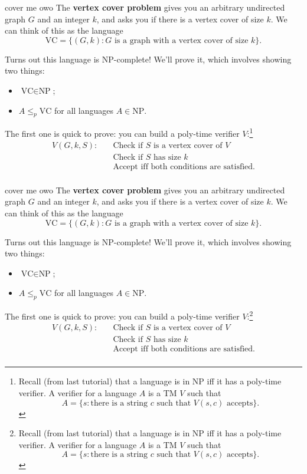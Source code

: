 \documentclass{beamer}
\begin{document}
\begin{frame}{cover me owo \emojiflushed}
The \textbf{vertex cover problem} gives you an arbitrary undirected graph $G$ and an integer $k$, and asks you if there is a vertex cover of size $k$. We can think of this as the language
$$\text{VC} = \{(G, k): \text{$G$ is a graph with a vertex cover of size $k$}\}.$$

Turns out this language is NP-complete! We'll prove it, which involves showing two things:
\begin{itemize}
\item $\text{VC}\in \text{NP}$;
\item $A \leq_p \text{VC}$ for all languages $A \in \text{NP}$.
\end{itemize}

The first one is quick to prove: you can build a poly-time verifier $V$:\footnote{
Recall (from last tutorial) that a language is in NP iff it has a poly-time verifier. A verifier for a language $A$ is a TM $V$ such that
$$A = \{s: \text{there is a string $c$ such that $V(s, c)$ accepts}\}.$$}
\begin{align*}
V(G, k, S): \quad &\text{Check if $S$ is a vertex cover of $V$}\\
&\text{Check if $S$ has size $k$}\\
&\text{Accept iff both conditions are satisfied.}\\
\end{align*}
\end{frame}

\begin{frame}{cover me owo \emojiflushed}
The \textbf{vertex cover problem} gives you an arbitrary undirected graph $G$ and an integer $k$, and asks you if there is a vertex cover of size $k$. We can think of this as the language
$$\text{VC} = \{(G, k): \text{$G$ is a graph with a vertex cover of size $k$}\}.$$

Turns out this language is NP-complete! We'll prove it, which involves showing two things:
\begin{itemize}
\item $\text{VC}\in \text{NP}$;
\item $A \leq_p \text{VC}$ for all languages $A \in \text{NP}$.
\end{itemize}

The first one is quick to prove: you can build a poly-time verifier $V$:\footnote{
Recall (from last tutorial) that a language is in NP iff it has a poly-time verifier. A verifier for a language $A$ is a TM $V$ such that
$$A = \{s: \text{there is a string $c$ such that $V(s, c)$ accepts}\}.$$}
\begin{align*}
V(G, k, S): \quad &\text{Check if $S$ is a vertex cover of $V$}\\
&\text{Check if $S$ has size $k$}\\
&\text{Accept iff both conditions are satisfied.}\\
\end{align*}
\end{frame}
\end{document}
